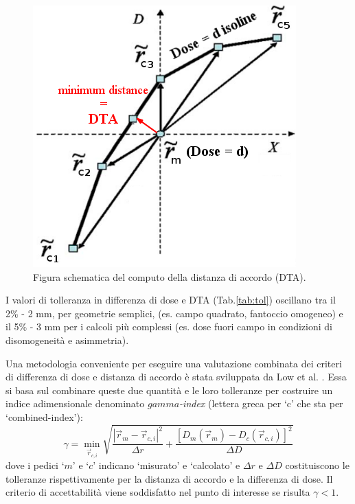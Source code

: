 \begin{figure}
\centering
\includegraphics[width=.5\textwidth]{./cap2/DTA.png}
\caption{Figura schematica del computo della distanza di accordo (DTA).}
\label{fig:DTA}
\end{figure}

I valori di tolleranza in differenza di dose e DTA (Tab.\ref{tab:tol}) oscillano tra il 2\% - 2 mm, per geometrie semplici, (es. campo quadrato, fantoccio omogeneo) e il 5\% - 3 mm per i calcoli più complessi (es. dose fuori campo in condizioni di disomogeneità e asimmetria).

Una metodologia conveniente per eseguire una valutazione combinata dei criteri di differenza di dose e distanza di accordo è stata sviluppata da Low et al. \cite{Low1998}. Essa si basa sul combinare queste due quantità e le loro tolleranze per costruire un indice adimensionale denominato \textit{$gamma$-index} (lettera greca per `c' che sta per `combined-index'):
\begin{equation}
\gamma = \min_{\vec{r}_{c,i}} \sqrt{\frac{|\vec{r}_{m}-\vec{r}_{c,i}|^2}{\Delta r}   + \frac{\left[D_{m}(\vec{r}_{m})-D_{c}(\vec{r}_{c,i})\right]^2}{\Delta D} }
\label{eq:gamma}
\end{equation}
dove i pedici `$m$' e `$c$' indicano `misurato' e `calcolato' e $\Delta r$ e $\Delta D$ costituiscono le tolleranze rispettivamente per la distanza di accordo e la differenza di dose. Il criterio di accettabilità viene soddisfatto nel punto di interesse se risulta $\gamma < 1$.

